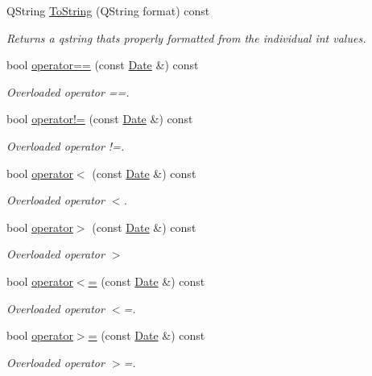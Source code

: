 \begin{DoxyCompactItemize}
Q\+String \hyperlink{class_date_a4ba2694d9bbd84819322e8ed2fb112a5}{To\+String} (Q\+String format) const 
\begin{DoxyCompactList}\small\item\em Returns a qstring thats properly formatted from the individual int values. \end{DoxyCompactList}\item 
bool \hyperlink{class_date_ad54d8e4b8f2ad6df8eda3b8615c3c0b2}{operator==} (const \hyperlink{class_date}{Date} \&) const 
\begin{DoxyCompactList}\small\item\em Overloaded operator ==. \end{DoxyCompactList}\item 
bool \hyperlink{class_date_adc801e7b23c84cd65dd70a9ac76344e3}{operator!=} (const \hyperlink{class_date}{Date} \&) const 
\begin{DoxyCompactList}\small\item\em Overloaded operator !=. \end{DoxyCompactList}\item 
bool \hyperlink{class_date_a691bafd5bba9540f3c540f7327a758c2}{operator$<$} (const \hyperlink{class_date}{Date} \&) const 
\begin{DoxyCompactList}\small\item\em Overloaded operator $<$. \end{DoxyCompactList}\item 
bool \hyperlink{class_date_a0bd06d545842c948cdca8ccc60d7d68d}{operator$>$} (const \hyperlink{class_date}{Date} \&) const 
\begin{DoxyCompactList}\small\item\em Overloaded operator $>$ \end{DoxyCompactList}\item 
bool \hyperlink{class_date_a6632fd56fe1c549ef0a257c85fd8eb3e}{operator$<$=} (const \hyperlink{class_date}{Date} \&) const 
\begin{DoxyCompactList}\small\item\em Overloaded operator $<$=. \end{DoxyCompactList}\item 
bool \hyperlink{class_date_ae4802fa52cf81f1a259b4a3b88bffc0d}{operator$>$=} (const \hyperlink{class_date}{Date} \&) const 
\begin{DoxyCompactList}\small\item\em Overloaded operator $>$=. \end{DoxyCompactList}\item 

\end{DoxyCompactItemize}
